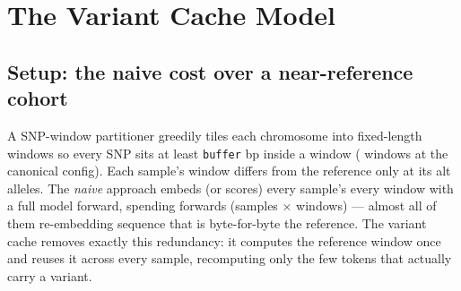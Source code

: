 \documentclass[11pt]{article}
\begin{document}
\section{The Variant Cache Model}
\label{sec:method}

\subsection{Setup: the naive cost over a near-reference cohort}
A SNP-window partitioner greedily tiles each chromosome into fixed-length windows
so every SNP sits at least \texttt{buffer} bp inside a window (\nWindows{}
windows at the canonical config). Each sample's window differs from the reference
only at its alt alleles. The \emph{naive} approach embeds (or scores) every
sample's every window with a full model forward, spending \naiveForwards{}
forwards (samples $\times$ windows) --- almost all of them re-embedding sequence
that is byte-for-byte the reference. The variant cache removes exactly this
redundancy: it computes the reference window once and reuses it across every
sample, recomputing only the few tokens that actually carry a variant.
\end{document}
